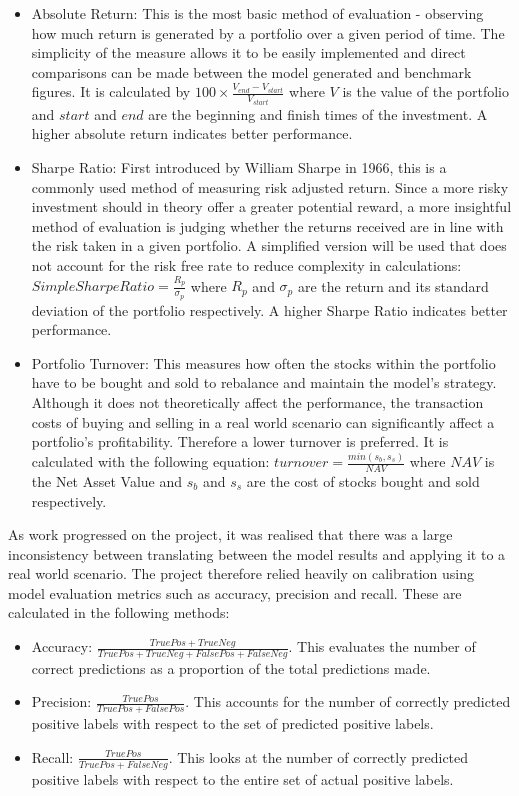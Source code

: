 \documentclass[10pt,onecolumn,letterpaper]{article}
\begin{document}
\begin{itemize}
	\item Absolute Return: This is the most basic method of evaluation - observing how much return is generated by a portfolio over a given period of time. The simplicity of the measure allows it to be easily implemented and direct comparisons can be made between the model generated and benchmark figures. It is calculated by $100\times \frac{V_{end} - V_{start}}{V_{start}}$ where $V$ is the value of the portfolio and $start$ and $end$ are the beginning and finish times of the investment. A higher absolute return indicates better performance. 
	\item	Sharpe Ratio: First introduced by William Sharpe\cite{Sharpe} in 1966, this is a commonly used method of measuring risk adjusted return. Since a more risky investment should in theory offer a greater potential reward, a more insightful method of evaluation is judging whether the returns received are in line with the risk taken in a given portfolio. A simplified version will be used that does not account for the risk free rate to reduce complexity in calculations: $Simple Sharpe Ratio = \frac{R_{p}}{\sigma_{p}}$ where $R_{p}$ and $\sigma_p$ are the return and its standard deviation of the portfolio respectively. A higher Sharpe Ratio indicates better performance.  
	\item Portfolio Turnover: This measures how often the stocks within the portfolio have to be bought and sold to rebalance and maintain the model's strategy. Although it does not theoretically affect the performance, the transaction costs of buying and selling in a real world scenario can significantly affect a portfolio's profitability. Therefore a lower turnover is preferred. It is calculated with the following equation: $turnover = \frac{min(s_{b}, s_{s})}{NAV}$ where $NAV$ is the Net Asset Value and $s_{b}$ and $s_{s}$ are the cost of stocks bought and sold respectively.  
\end{itemize}

As work progressed on the project, it was realised that there was a large inconsistency between translating between the model results and applying it to a real world scenario. The project therefore relied heavily on calibration using model evaluation metrics such as accuracy, precision and recall. These are calculated in the following methods: 

\begin{itemize}
	\item Accuracy: $\frac{TruePos + TrueNeg}{TruePos + TrueNeg + FalsePos + FalseNeg}$. This evaluates the number of correct predictions as a proportion of the total predictions made.
	\item Precision: $\frac{TruePos}{TruePos + FalsePos}$. This accounts for the number of correctly predicted positive labels with respect to the set of predicted positive labels.
	\item Recall: $\frac{TruePos}{TruePos + FalseNeg}$. This looks at the number of correctly predicted positive labels with respect to the entire set of actual positive labels. 
\end{itemize}
\end{document}
